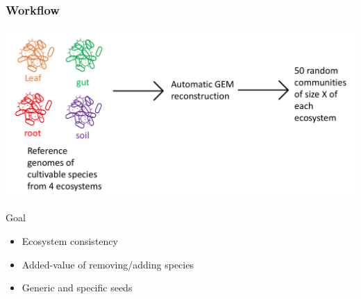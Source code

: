 \documentclass[8pt,usenames,dvipsnames]{beamer}
\begin{document}
\begin{frame}
\frametitle{Workflow}

\includegraphics[width=\textwidth]{figures/workflow-ccmc.pdf}

\begin{block}{Goal}
\begin{itemize}
\item Ecosystem consistency
\item Added-value of removing/adding species
\item Generic and specific seeds
\end{itemize}
\end{block}

\end{frame}
\end{document}

